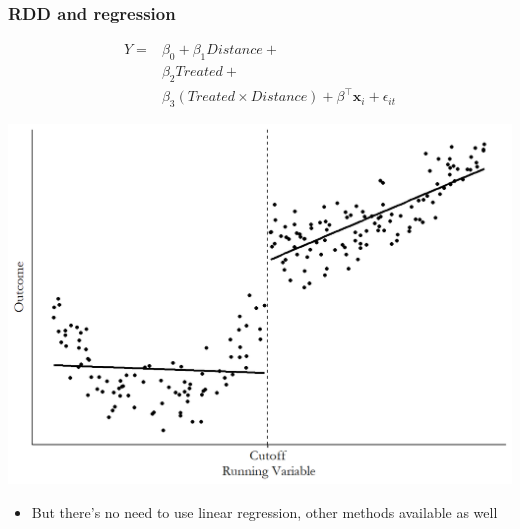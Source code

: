 \documentclass[aspectratio=43]{beamer}
\begin{document}
\begin{frame}
\frametitle{RDD and regression}
\centering


\begin{minipage}{0.49\textwidth}\centering
\begin{equation}
\begin{split}
    Y =&  \beta_0 + \beta_{1} Distance +\\
    &\beta_2 Treated +\\
    &\beta_3 (Treated \times Distance) + \beta^\top \mathbf{x}_{i} + \epsilon_{it}
\end{split}
\end{equation}
\end{minipage}\hfill
\begin{minipage}{0.49\textwidth}\centering
\includegraphics[width = \textwidth]{../img/rdd_lm}
\end{minipage}


\begin{itemize}
  \item But there's no need to use linear regression, other methods available as well
\end{itemize}

\end{frame}
\end{document}
